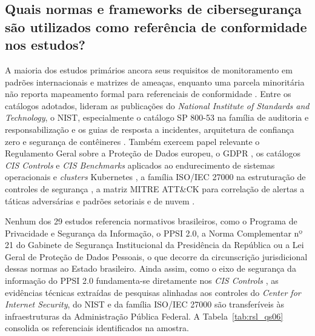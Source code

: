 \subsection{Quais normas e frameworks de cibersegurança são utilizados como referência de conformidade nos estudos?}
\label{subsec:rsl_qs06}

A maioria dos estudos primários ancora seus requisitos de monitoramento em padrões internacionais e matrizes de ameaças, enquanto uma parcela minoritária não reporta mapeamento formal para referenciais de conformidade \cite{gajra2025,darwesh2024,sushma2025,albuquerque2024,hao2025}. Entre os catálogos adotados, lideram as publicações do \textit{National Institute of Standards and Technology}, o NIST, especialmente o catálogo SP 800-53 na família de auditoria e responsabilização e os guias de resposta a incidentes, arquitetura de confiança zero e segurança de contêineres \cite{velasquez2025,giulio2017,jin2025,aftab2026,shao2026a,shao2026b}. Também exercem papel relevante o Regulamento Geral sobre a Proteção de Dados europeu, o GDPR \cite{portillo2019,devarajulu2025,mahida2026}, os catálogos \textit{CIS Controls} e \textit{CIS Benchmarks} aplicados ao endurecimento de sistemas operacionais e \textit{clusters} Kubernetes \cite{torkura2021,bungei2026,xu2025,joshisabhaya2026}, a família ISO/IEC 27000 na estruturação de controles de segurança \cite{enaw2018,acosta2025}, a matriz MITRE ATT\&CK para correlação de alertas a táticas adversárias \cite{sasmito2025,zhang2025,kalafatidis2025,joshisegireddy2026} e padrões setoriais e de nuvem \cite{giulio2017,coutinho2023,ali2024}.

Nenhum dos 29 estudos referencia normativos brasileiros, como o Programa de Privacidade e Segurança da Informação, o PPSI 2.0, a Norma Complementar nº 21 do Gabinete de Segurança Institucional da Presidência da República ou a Lei Geral de Proteção de Dados Pessoais, o que decorre da circunscrição jurisdicional dessas normas ao Estado brasileiro. Ainda assim, como o eixo de segurança da informação do PPSI 2.0 fundamenta-se diretamente nos \textit{CIS Controls} \cite{ppsi2026}, as evidências técnicas extraídas de pesquisas alinhadas aos controles do \textit{Center for Internet Security}, do NIST e da família ISO/IEC 27000 são transferíveis às infraestruturas da Administração Pública Federal. A Tabela~\ref{tab:rsl_qs06} consolida os referenciais identificados na amostra.

